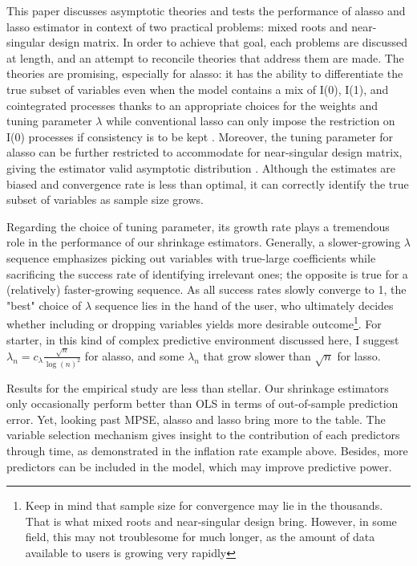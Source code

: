 \documentclass[12pt,a4paper]{article}
\begin{document}
This paper discusses asymptotic theories and tests the performance of alasso and lasso estimator in context of two practical problems: mixed roots and near-singular design matrix. In order to achieve that goal, each problems are discussed at length, and an attempt to reconcile theories that address them are made. The theories are promising, especially for alasso: it has the ability to differentiate the true subset of variables even when the model contains a mix of I(0), I(1), and cointegrated processes thanks to an appropriate choices for the weights and tuning parameter $ \lambda $ while conventional lasso can only impose the restriction on I(0) processes if consistency is to be kept \citep{lee2018lasso}. Moreover, the tuning parameter for alasso can be further restricted to accommodate for near-singular design matrix, giving the estimator valid asymptotic distribution \citep{knight2008shrinkage}. Although the estimates are biased and convergence rate is less than optimal, it can correctly identify the true subset of variables as sample size grows.

Regarding the choice of tuning parameter, its growth rate plays a tremendous role in the performance of our shrinkage estimators. Generally, a slower-growing $ \lambda $ sequence emphasizes picking out variables with true-large coefficients while sacrificing the success rate of identifying irrelevant ones; the opposite is true for a (relatively) faster-growing sequence. As all success rates slowly converge to 1, the "best" choice of $ \lambda $ sequence lies in the hand of the user, who ultimately decides whether including or dropping variables yields more desirable outcome\footnote{Keep in mind that sample size for convergence may lie in the thousands. That is what mixed roots and near-singular design bring. However, in some field, this may not troublesome for much longer, as the amount of data available to users is growing very rapidly}.
For starter, in this kind of complex predictive environment discussed here, I suggest $ \lambda_n = c_\lambda \frac{\sqrt{n}}{\log(n)^2} $ for alasso, and some $ \lambda_n $ that grow slower than $ \sqrt{n} $ for lasso.

Results for the empirical study are less than stellar. Our shrinkage estimators only occasionally perform better than OLS in terms of out-of-sample prediction error. Yet, looking past MPSE, alasso and lasso bring more to the table. The variable selection mechanism gives insight to the contribution of each predictors through time, as demonstrated in the inflation rate example above. Besides, more predictors can be included in the model, which may improve predictive power.
\end{document}
